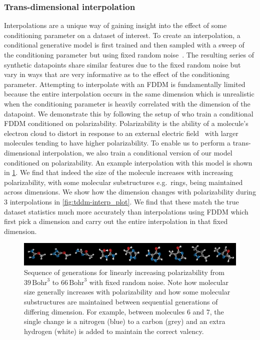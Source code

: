 \subsubsection{Trans-dimensional interpolation}
\label{sec:mol_interp}
Interpolations are a unique way of gaining insight into the effect of some conditioning parameter on a dataset of interest.
To create an interpolation, a conditional generative model is first trained and then sampled with a sweep of the conditioning parameter but using fixed random noise~\citep{hoogeboom2022equivariant}.
The resulting series of synthetic datapoints share similar features due to the fixed random noise but vary in ways that are very informative as to the effect of the conditioning parameter. 
Attempting to interpolate with an FDDM is fundamentally limited because the entire interpolation occurs in the same dimension which is unrealistic when the conditioning parameter is heavily correlated with the dimension of the datapoint. We demonstrate this by following the setup of \citet{hoogeboom2022equivariant} who train a conditional FDDM conditioned on polarizability. Polarizability is the ability of a molecule's electron cloud to distort in response to an external electric field~\citep{modernphysicalorganicchemistry} with larger molecules tending to have higher polarizability. To enable us to perform a trans-dimensional interpolation, we also train a conditional version of our model conditioned on polarizability. An example interpolation with this model is shown in \cref{fig:tddm-interp}. We find that indeed the size of the molecule increases with increasing polarizability, with some molecular substructures e.g.~rings, being maintained across dimensions.
We show how the dimension changes with polarizability during 3 interpolations in \cref{fig:tddm-interp_plot}. We find that these match the true dataset statistics much more accurately than interpolations using FDDM which first pick a dimension and carry out the entire interpolation in that fixed dimension.

\begin{figure}[t]
    \centering
    \includegraphics[width=\textwidth]{figs/tddm/small_interp_bright.pdf}
    \caption{Sequence of generations for linearly increasing polarizability from $39 \, \text{Bohr}^3$ to $66 \, \text{Bohr}^3$ with fixed random noise. Note how molecular size generally increases with polarizability and how some molecular substructures are maintained between sequential generations of differing dimension. For example, between molecules 6 and 7, the single change is a nitrogen (blue) to a carbon (grey) and an extra hydrogen (white) is added to maintain the correct valency.}
    \label{fig:tddm-interp}
\end{figure}



